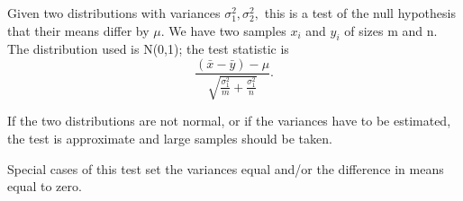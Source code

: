  Given two distributions with variances $ \sigma _1 ^2 , \sigma _2 ^2 , $
this is a test of the null hypothesis that their means differ by
$ \mu . $ We have two samples $x_{i}$  and $y_{i}$  of sizes m and n. The distribution used is N(0,1); the
test statistic is \[ \frac{ ( \bar{x} - \bar{y} ) - \mu }
{ \sqrt {\frac{\sigma _1 ^2 }{m} + \frac{\sigma _1 ^2}{n} } } . \]
\par
If the two distributions are not normal, or if the
variances have to be estimated, the test is approximate and
large samples should be taken.
\par
Special cases of this test set the variances equal and/or 
the difference in means equal to zero.
